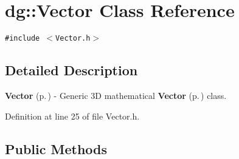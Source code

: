 \section{dg::Vector Class Reference}
\label{classdg_1_1Vector}
{\tt \#include $<$Vector.h$>$}



\subsection{Detailed Description}
{\bf Vector} {\rm (p.\,\pageref{classdg_1_1Vector})} - Generic 3D mathematical {\bf Vector} {\rm (p.\,\pageref{classdg_1_1Vector})} class.



Definition at line 25 of file Vector.h.\subsection*{Public Methods}
